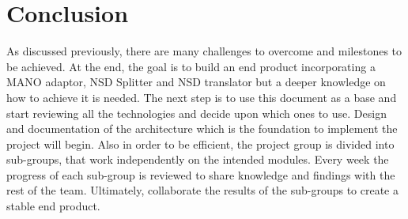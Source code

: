\chapter{Conclusion}
\label{ch:Conclusion}
As discussed previously, there are many challenges to overcome and milestones to be achieved.
At the end, the goal is to build an end product incorporating a MANO adaptor, NSD Splitter and NSD translator but a deeper knowledge on how to achieve it is needed. The next step is to use this document as a base and start reviewing all the technologies and decide upon which ones to use. Design and documentation of the architecture which is the foundation to implement the project will begin.
Also in order to be efficient, the project group is divided into sub-groups, that work independently on the intended modules. Every week the progress of each sub-group is reviewed to share knowledge and findings with the rest of the team. Ultimately, collaborate the results of the sub-groups to create a stable end product. 
